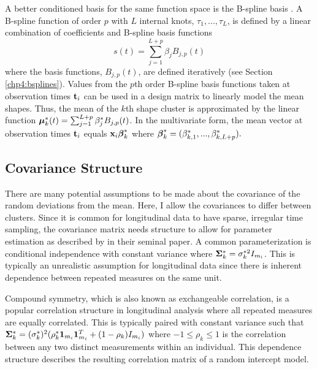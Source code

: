 A better conditioned basis for the same function space is the B-spline basis \cite{deboor1978, schumaker1981,curry1966, de1976}. A B-spline function of order $p$ with $L$ internal knots, $\tau_{1},...,\tau_{L}$, is defined by a linear combination of coefficients and B-spline basis functions
$$s(t) = \sum^{L+p}_{j=1} \beta_j B_{j,p}(t)$$
where the basis functions, $B_{j,p}(t)$, are defined iteratively \cite{deboor1972,cox1972} (see Section \ref{chp4:bsplines}). Values from the $p$th order B-spline basis functions taken at observation times $\mathbf t_{i}$ can be used in a design matrix to linearly model the mean shapes. Thus, the mean of the $k$th shape cluster is approximated by the linear function $\boldsymbol\mu^{*}_{k}(t) = \sum^{L+p}_{j=1} \beta^{*}_j B_{j,p}(t)$. In the multivariate form, the mean vector at observation times $\mathbf t_{i}$ equals $\mathbf x_{i}\boldsymbol\beta^{*}_{k}$ where $\boldsymbol\beta^{*}_{k}=(\beta^{*}_{k,1},...,\beta^{*}_{k, L+p}).$  

\subsection{Covariance Structure}
There are many potential assumptions to be made about the covariance of the random deviations from the mean. Here, I allow the covariances to differ between clusters. Since it is common for longitudinal data to have sparse, irregular time sampling, the covariance matrix needs structure to allow for parameter estimation as described by \textcite{jennrich1986} in their seminal paper. A common parameterization is conditional independence with constant variance where $\mathbf \Sigma^{*}_{k}= \sigma_{k}^{*2}I_{m_{i}}$. This is typically an unrealistic assumption for longitudinal data since there is inherent dependence between repeated measures on the same unit. 

Compound symmetry, which is also known as exchangeable correlation, is a popular correlation structure in longitudinal analysis where all repeated measures are equally correlated. This is typically paired with constant variance such that $\mathbf \Sigma^{*}_{k} =( \sigma^{*}_{k})^{2}(\rho^{*}_{k}\mathbf1_{m_{i}}\mathbf1_{m_{i}}^{T}+(1-\rho_{k})I_{m_{i}})$ where $-1\leq\rho_{k}\leq 1$ is the correlation between any two distinct measurements within an individual. This dependence structure describes the resulting correlation matrix of a random intercept model.

